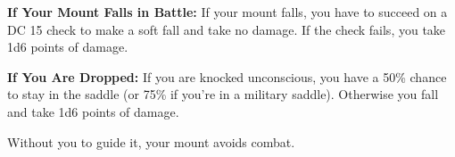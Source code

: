 \textbf{If Your Mount Falls in Battle:} If your mount falls, you have to succeed on a DC 15  check to make a soft fall and take no damage. If the check fails, you take 1d6 points of damage.

\textbf{If You Are Dropped:} If you are knocked unconscious, you have a 50\% chance to stay in the saddle (or 75\% if you're in a military saddle). Otherwise you fall and take 1d6 points of damage.

Without you to guide it, your mount avoids combat.